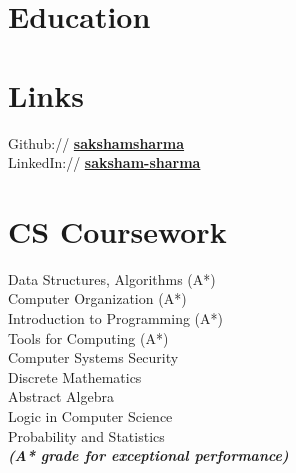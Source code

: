 \documentclass[a4paper]{deedy-resume} %
\begin{document}

\begin{minipage}[t]{0.33\textwidth} %

  \section{Education}



  \sectionspace
  \sectionspace
  \sectionspace


  \sectionspace

  \section{Links}

  Github:// \href{https://github.com/sakshamsharma}{\bf sakshamsharma} \\
  LinkedIn:// \href{https://www.linkedin.com/in/sakshamsharma}{\bf saksham-sharma} \\

  \sectionspace

  \section{CS Coursework}
  Data Structures, Algorithms (A*)\\
  Computer Organization (A*)\\
  Introduction to Programming (A*)\\
  Tools for Computing (A*)\\
  Computer Systems Security\\
  Discrete Mathematics\\
  Abstract Algebra\\
  Logic in Computer Science\\
  Probability and Statistics\\

  {\footnotesize \textit{\textbf{(A* grade for exceptional performance) }}} \\


\end{minipage}
\end{document}

